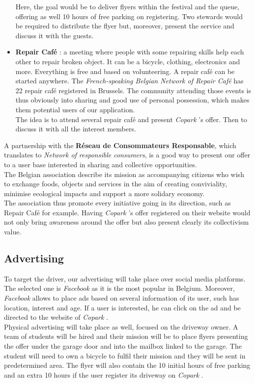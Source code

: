 \documentclass[12pt,a4paper,oneside]{book}
\newcommand{\bp}{\textit{Copark }}
\begin{document}
\begin{itemize}
Here, the goal would be to deliver flyers within the festival and the queue, offering as well 10 hours of free parking on registering. Two stewards would be required to distribute the flyer but, moreover, present the service and discuss it with the guests.
\item \textbf{Repair Café} : a meeting where people with some repairing skills help each other to repair broken object. It can be a bicycle, clothing, electronics and more. Everything is free and based on volunteering. A repair café can be started anywhere. The \textit{French-speaking Belgian Network of Repair Café} has 22 repair café registered in Brussels.\cite{repair} The community attending those events is thus obviously into sharing and good use of personal possession, which makes them potential users of our application.\\
The idea is to attend several repair café and present \bp's offer. Then to discuss it with all the interest members.
\end{itemize}

A partnership with the \textbf{Réseau de Consommateurs Responsable}, which translates to \textit{Network of responsible consumers}, is a good way to present our offer to a user base interested in sharing and collective opportunities.\\
The Belgian association describe its mission as accompanying citizens who wish to exchange foods, objects and services in the aim of creating conviviality, minimise ecological impacts and support a more solidary economy.\cite{rcr}\\
The association thus promote every initiative going in its direction, such as Repair Café for example. Having \bp's offer registered on their website would not only bring awareness around the offer but also present clearly its collectivism value.

\subsection{Advertising}
To target the driver, our advertising will take place over social media platforms. The selected one is \textit{Facebook} as it is the most popular in Belgium.\cite{smstat} Moreover, \textit{Facebook} allows to place ads based on several information of its user, such has location, interest and age. If a user is interested, he can click on the ad and be directed to the website of \bp.\\

Physical advertising will take place as well, focused on the driveway owner. A team of students will be hired and their mission will be to place flyers presenting the offer under the garage door and into the mailbox linked to the garage. The student will need to own a bicycle to fulfil their mission and they will be sent in predetermined area. The flyer will also contain the 10 initial hours of free parking and an extra 10 hours if the user register its driveway on \bp.
\end{document}
